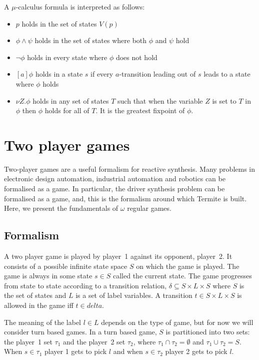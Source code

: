 A $\mu$-calculus formula is interpreted as follows:
\begin{itemize}
    \item $p$ holds in the set of states $V(p)$
    \item $\phi \wedge \psi$ holds in the set of states where both $\phi$ and $\psi$ hold
    \item $\neg \phi$ holds in every state where $\phi$ does not hold 
    \item $[a]\phi$ holds in a state $s$ if every $a$-transition leading out of $s$ leads to a state where $\phi$ holds
    \item $\nu Z. \phi$ holds in any set of states $T$ such that when the variable $Z$ is set to $T$ in $\phi$ then $\phi$ holds for all of $T$. It is the greatest fixpoint of $\phi$.
\end{itemize}

\section{Two player games}


Two-player games are a useful formalism for reactive synthesis. Many problems in electronic design automation, industrial automation and robotics can be formalised as a game. In particular, the driver synthesis problem can be formalised as a game, and, this is the formalism around which Termite is built. Here, we present the fundamentals of $\omega$ regular games. 

\subsection{Formalism}

A two player game is played by player~1 against its opponent, player~2. It consists of a possible infinite state space $S$ on which the game is played. The game is always in some state $s \in S$ called the current state. The game progresses from state to state according to a transition relation, $\delta \subseteq S \times L \times S$ where $S$ is the set of states and $L$ is a set of label variables. A transition $t \in S \times L \times S$ is allowed in the game iff $t \in delta$. 

The meaning of the label $l \in L$ depends on the type of game, but for now we will consider turn based games. In a turn based game, $S$ is partitioned into two sets: the player~1 set $\tau_1$ and the player~2 set $\tau_2$, where $\tau_1 \cap \tau_2 = \emptyset$ and $ \tau_1 \cup \tau_2 = S$. When $s \in \tau_1$ player 1 gets to pick $l$ and when $s \in \tau_2$ player 2 gets to pick $l$.


